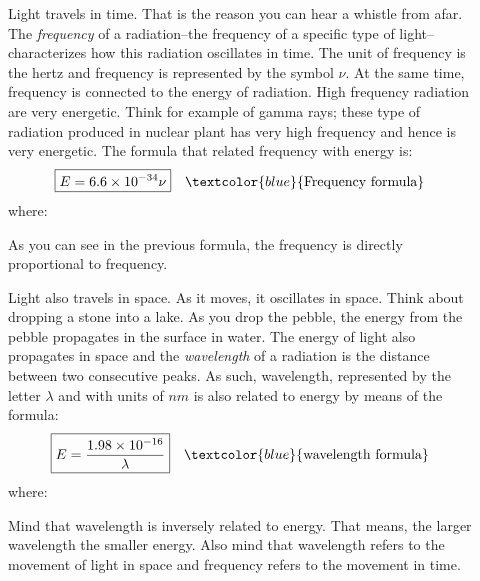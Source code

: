 \documentclass[main.tex]{subfiles}
\begin{document}
\begin{description}
\item[] Light travels in time. That is the reason you can hear a whistle from afar. The \emph{frequency} of a radiation--the frequency of a specific type of light--characterizes how this radiation oscillates in time. The unit of frequency is the hertz and frequency is represented by the symbol $\nu$. At the same time, frequency is connected to the energy of radiation. High frequency radiation are very energetic. Think for example of gamma rays; these type of radiation produced in nuclear plant has very high frequency and hence is very energetic. The formula that related frequency with energy is:%
\begin{equation*}
\boxed{  E=6.6\times 10^{-34}\nu  } \quad \textcolor{blue}{\text{Frequency formula}}
\end{equation*}
where:
As you can see in the previous formula, the frequency is directly proportional to frequency.
\item[] Light also travels in space. As it moves, it oscillates in space. Think about dropping a stone into a lake. As you drop the pebble, the energy from the pebble propagates in the surface in water. The energy of light also propagates in space and the \emph{wavelength} of a radiation is the distance between two consecutive peaks. As such, wavelength, represented by the letter $\lambda$ and with units of $nm$ is also related to energy by means of the formula:
\begin{equation*}
\boxed{  E=\frac{1.98\times 10^{-16}}{\lambda}  } \quad \textcolor{blue}{\text{wavelength formula}}
\end{equation*}
where:
Mind that wavelength is inversely related to energy. That means, the larger wavelength the smaller energy. Also mind that wavelength refers to the movement of light in space and frequency refers to the movement in time.


\end{description}
\end{document}
